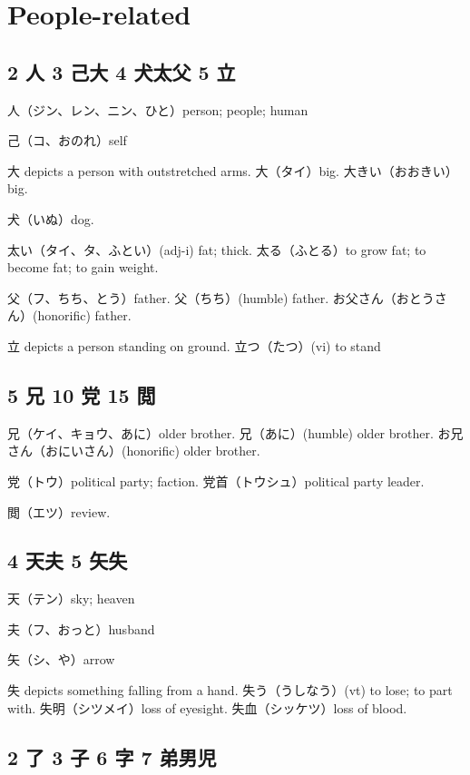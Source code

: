 \section{People-related}

\subsection{2 人 3 己大 4 犬太父 5 立}

人（ジン、レン、ニン、ひと）person; people; human

己（コ、おのれ）self

大 depicts a person with outstretched arms.
大（タイ）big.
大きい（おおきい）big.

犬（いぬ）dog.

太い（タイ、タ、ふとい）(adj-i) fat; thick.
太る（ふとる）to grow fat; to become fat; to gain weight.

父（フ、ちち、とう）father.
父（ちち）(humble) father.
お父さん（おとうさん）(honorific) father.

立 depicts a person standing on ground.
立つ（たつ）(vi) to stand

\subsection{5 兄 10 党 15 閲}

兄（ケイ、キョウ、あに）older brother.
兄（あに）(humble) older brother.
お兄さん（おにいさん）(honorific) older brother.

党（トウ）political party; faction.
党首（トウシュ）political party leader.

閲（エツ）review.

\subsection{4 天夫 5 矢失}

天（テン）sky; heaven

夫（フ、おっと）husband

矢（シ、や）arrow

失 depicts something falling from a hand.
失う（うしなう）(vt) to lose; to part with.
失明（シツメイ）loss of eyesight.
失血（シッケツ）loss of blood.

\subsection{2 了 3 子 6 字 7 弟男児}

